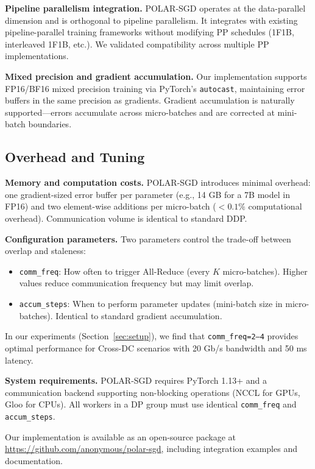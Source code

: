 \textbf{Pipeline parallelism integration.} POLAR-SGD operates at the data-parallel dimension and is orthogonal to pipeline parallelism. It integrates with existing pipeline-parallel training frameworks without modifying PP schedules (1F1B, interleaved 1F1B, etc.). We validated compatibility across multiple PP implementations.

\textbf{Mixed precision and gradient accumulation.} Our implementation supports FP16/BF16 mixed precision training via PyTorch's \texttt{autocast}, maintaining error buffers in the same precision as gradients.  Gradient accumulation is naturally supported—errors accumulate across micro-batches and are corrected at mini-batch boundaries. 

\subsection{Overhead and Tuning}

\textbf{Memory and computation costs.} POLAR-SGD introduces minimal overhead:  one gradient-sized error buffer per parameter (e.g., 14 GB for a 7B model in FP16) and two element-wise additions per micro-batch ($<0.1\%$ computational overhead). Communication volume is identical to standard DDP. 

\textbf{Configuration parameters.} Two parameters control the trade-off between overlap and staleness: 
\begin{itemize}
    \item \texttt{comm\_freq}: How often to trigger All-Reduce (every $K$ micro-batches). Higher values reduce communication frequency but may limit overlap.
    \item \texttt{accum\_steps}: When to perform parameter updates (mini-batch size in micro-batches). Identical to standard gradient accumulation.
\end{itemize}
In our experiments (Section~\ref{sec:setup}), we find that \texttt{comm\_freq=2--4} provides optimal performance for Cross-DC scenarios with 20 Gb/s bandwidth and 50 ms latency.

\textbf{System requirements.} POLAR-SGD requires PyTorch 1.13+ and a communication backend supporting non-blocking operations (NCCL for GPUs, Gloo for CPUs). All workers in a DP group must use identical \texttt{comm\_freq} and \texttt{accum\_steps}.

Our implementation is available as an open-source package at \url{https://github.com/anonymous/polar-sgd}, including integration examples and documentation.